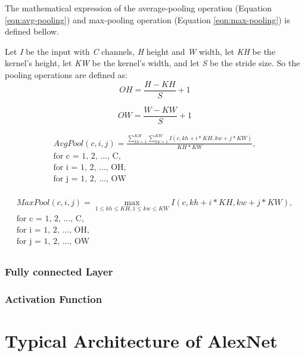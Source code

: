 The mathematical expression of the average-pooling operation (Equation \ref{eqn:avg-pooling}) and max-pooling operation (Equation \ref{eqn:max-pooling}) is defined bellow.

Let \emph{I} be the input with \emph{C} channels, \emph{H} height and \emph{W} width, let \emph{KH} be the kernel's height, let \emph{KW} be the kernel's width, and let \emph{S} be the stride size. So the pooling operations are defined as:
\begin{equation}
	OH = \frac{H - KH}{S} + 1
\end{equation}

\begin{equation}
	OW = \frac{W - KW}{S} + 1
\end{equation}

\begin{equation}
	\label{eqn:avg-pooling}
	\begin{split}
		AvgPool(c, i, j) =
		\frac{
			\sum_{kh = 1}^{KH} \sum_{kw = 1}^{KW}
			I(c, kh + i * KH, kw + j * KW)
		}{
			KH * KW
		},\\
		\mbox{for c = 1, 2, ..., C},\\
		\mbox{for i = 1, 2, ..., OH},\\
		\mbox{for j = 1, 2, ..., OW}\\
	\end{split}
\end{equation}

\begin{equation}
	\label{eqn:max-pooling}
	\begin{split}
		MaxPool(c, i, j) = \max_{1 \leq kh \leq KH, 1 \leq kw \leq KW}
		I(c, kh + i * KH, kw + j * KW),\\
		\mbox{for c = 1, 2, ..., C},\\
		\mbox{for i = 1, 2, ..., OH},\\
		\mbox{for j = 1, 2, ..., OW}\\
	\end{split}
\end{equation}

\subsubsection{Fully connected Layer}


\subsubsection{Activation Function}


\section{Typical Architecture of AlexNet}
